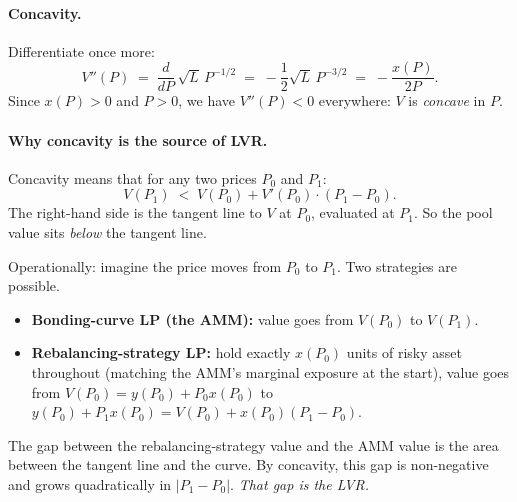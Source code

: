 \documentclass[11pt]{article}
\theoremstyle{definition}
\theoremstyle{remark}
\newcommand{\1}{\mathbf{1}}
\begin{document}
\paragraph{Concavity.}
Differentiate once more:
\[
V''(P) \;=\; \frac{d}{dP}\,\sqrt{L}\,P^{-1/2} \;=\; -\frac{1}{2}\sqrt{L}\,P^{-3/2} \;=\; -\frac{x(P)}{2P}.
\]
Since $x(P) > 0$ and $P > 0$, we have $V''(P) < 0$ everywhere: $V$ is \emph{concave} in $P$.

\paragraph{Why concavity is the source of LVR.}
Concavity means that for any two prices $P_0$ and $P_1$:
\[
V(P_1) \;<\; V(P_0) + V'(P_0) \cdot (P_1 - P_0).
\]
The right-hand side is the tangent line to $V$ at $P_0$, evaluated at $P_1$. So the pool value sits \emph{below} the tangent line.

Operationally: imagine the price moves from $P_0$ to $P_1$. Two strategies are possible.
\begin{itemize}[leftmargin=2em]
\item \textbf{Bonding-curve LP (the AMM):} value goes from $V(P_0)$ to $V(P_1)$.
\item \textbf{Rebalancing-strategy LP:} hold exactly $x(P_0)$ units of risky asset throughout (matching the AMM's marginal exposure at the start), value goes from $V(P_0) = y(P_0) + P_0 x(P_0)$ to $y(P_0) + P_1 x(P_0) = V(P_0) + x(P_0)(P_1 - P_0)$.
\end{itemize}
The gap between the rebalancing-strategy value and the AMM value is the area between the tangent line and the curve. By concavity, this gap is non-negative and grows quadratically in $|P_1 - P_0|$. \emph{That gap is the LVR.}
\end{document}
